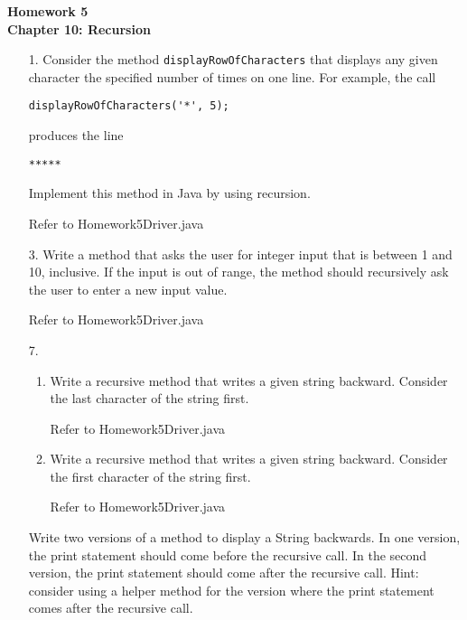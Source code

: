 \documentclass[10pt]{article}
\begin{document}
	\begin{center}
		\textbf{\large{Homework 5\\ Chapter 10: Recursion}}
	\end{center}
	
	\begin{enumerate}
		\item[1.] Consider the method \texttt{displayRowOfCharacters} that displays any given character the specified number of times on one line. For example, the call
			\begin{lstlisting}
displayRowOfCharacters('*', 5);
			\end{lstlisting}
			
			produces the line
			
			\texttt{*****}
			
			Implement this method in Java by using recursion.
			
			\vspace{0.5cm}
			Refer to Homework5Driver.java
			\vspace{0.5cm}
		
		\item[3.] Write a method that asks the user for integer input that is between 1 and 10, inclusive. If the input is out of range, the method should recursively ask the user to enter a new input value.
		
			\vspace{0.5cm}
			Refer to Homework5Driver.java
			\vspace{0.5cm}
		
		\item[7.]
			\begin{enumerate}
				\item Write a recursive method that writes a given string backward. Consider the last character of the string first.
				
					\vspace{0.5cm}
					Refer to Homework5Driver.java
					\vspace{0.5cm}
				
				\item Write a recursive method that writes a given string backward. Consider the first character of the string first.
					
					\vspace{0.5cm}
					Refer to Homework5Driver.java
					\vspace{0.5cm}
			\end{enumerate}
			
			Write two versions of a method to display a String backwards. In one version, the print statement should come before the recursive call. In the second version, the print statement should come after the recursive call. Hint: consider using a helper method for the version where the print statement comes after the recursive call.
		

\end{enumerate}
\end{document}
